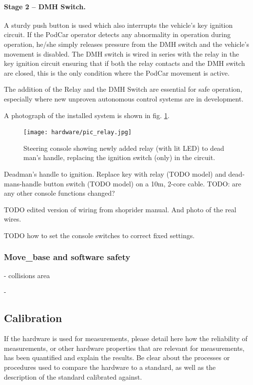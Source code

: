 \documentclass[a4paper]{article}
\begin{document}
\paragraph{Stage 2 – DMH Switch.} A sturdy push button is used which also interrupts the vehicle's key ignition circuit. If the PodCar operator detects any abnormality in operation during operation, he/she simply releases pressure from the DMH switch and the vehicle’s movement is disabled. The DMH switch is wired in series with the relay in the key ignition circuit ensuring that if both the relay contacts and the DMH switch are closed, this is the only condition where the PodCar movement is active.

The addition of the Relay and the DMH Switch are essential for safe operation, especially where new unproven autonomous control systems are in development.

A photograph of the installed system is shown in fig. \ref{fig:actuatorMounted}.

\begin{figure}[h]
	\texttt{[image: hardware/pic\_relay.jpg]}
	\caption{Steering console showing newly added relay (with lit LED) to dead man’s handle, replacing the ignition switch (only) in the circuit.}
	\label{fig:actuatorMounted}
\end{figure}

Deadman’s handle to ignition. Replace key with relay (TODO model) and dead-mans-handle button switch (TODO model) on a 10m, 2-core cable.    TODO: are any other console functions changed? 

TODO edited version of wiring from shoprider manual. And photo of the real wires.

TODO how to set the console switches to correct fixed settings.

\subsubsection{Move\_base and software safety}

- collisions area

- 




\subsection{Calibration}\label{h.kr90wh14sxr5}

If the hardware is used for measurements, please detail here how the
reliability of measurements, or other hardware properties that are
relevant for measurements, has been quantified and explain the
results. Be clear about the processes or procedures used to compare the
hardware to a standard, as well as the description of the standard
calibrated against.
\end{document}
